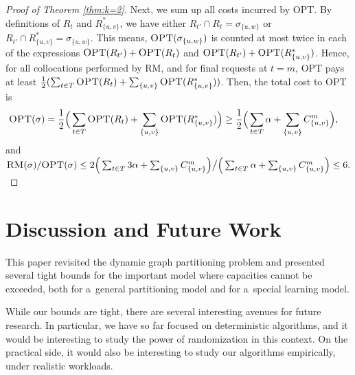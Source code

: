 \documentclass[a4paper,anonymous,USenglish]{lipics-v2019}
\newcommand{\OPT}{\textsc{OPT}\xspace}
\newcommand{\RM}{\textsc{RM}\xspace} %
\newcommand\mahmoud[1]{\color{orange}\textbf{Mahmoud: #1~}\color{black}}
\begin{document}
\begin{proof}[Proof of Theorem \ref{thm:k=2}]
	Next, we sum up all costs incurred by \OPT.
	By definitions of $R_t$ and $R^*_{\{u,v\}}$, we have either
	$R_{t'} \cap R_t = \sigma_{\{u,w\}}$ or
	$R_{t'} \cap R^*_{\{u,v\}} = \sigma_{\{u,w\}}$.
	This means,
	$\OPT ( \sigma_{\{u,w\}})$
	is counted at most twice in each of  the expressions
	$\OPT (R_{t'}) + \OPT (R_t)$
	and  
	$\OPT (R_{t'}) + \OPT(R^*_{\{u,v\}})$.
	Hence,
	for all collocations performed by \RM,
	and for final requests at $t=m$,
	\OPT pays at least 
	$\frac{1}{2}(
	\sum_{ t \in T } \OPT (R_t) +
	\sum_{\{u,v\}}\OPT (R^*_{\{u,v\}})
	) $.
	Then,
	the total cost to \OPT is
	\begin{align*} 	%
		\OPT (\sigma)
		&=
		\frac{1}{2}
		\Big(
		\sum_{ t \in T} \OPT (R_t) 
		+ \sum_{\{u,v\}}\OPT (R^*_{\{u,v\}})
		\Big)	
		\geq
		\frac{1}{2}		
		\Big(
		\sum_{ t \in T} \alpha  
		+ \sum_{\{u,v\}} C^{m}_{\{u,v\}}
		\Big),
	\end{align*}
and
$
	\RM(\sigma)	/
	\OPT (\sigma)
	\leq
	2\Big(
	\sum_{ t \in T} 3\alpha +
	\sum_{\{u,v\}} C^{m}_{\{u,v\}}
	\Big)	 \big /
	\Big(
	\sum_{ t \in T} \alpha  
	+ \sum_{\{u,v\}} C^{m}_{\{u,v\}}  
	\Big) 	\leq 6.
$
\end{proof}


\noindent


\section{Discussion and Future Work}

This paper revisited the dynamic graph partitioning problem and presented several tight bounds for the important model where capacities cannot be exceeded, both for a~general partitioning model and for a~special learning model. 

While our bounds are tight, there are several interesting avenues for future research.
In particular, we have so far focused on deterministic algorithms, and it would be interesting to study the power of randomization in this context.
On the practical side, it would also be interesting to study our algorithms empirically, under realistic workloads.
\end{document}

